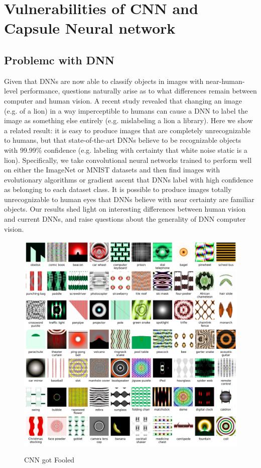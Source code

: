 \documentclass[12pt]{article}
\begin{document}
\section{\fontsize{14}{14}\selectfont Vulnerabilities of CNN and Capsule Neural network}   
\subsection{Problemc with DNN}
 Given that DNNs are now able to classify objects in images with near-human-level performance, questions naturally arise as to what differences remain between computer and human vision. A recent study revealed that changing an image (e.g. of a lion) in a way imperceptible to humans can cause a DNN to label the image as something else entirely (e.g. mislabeling a lion a library). Here we show a related result: it is easy to produce images that are completely unrecognizable to humans, but that state-of-the-art DNNs believe to be recognizable objects with 99.99\% confidence (e.g. labeling with certainty that white noise static is a lion). Specifically, we take convolutional neural networks trained to perform well on either the ImageNet or MNIST datasets and then find images with evolutionary algorithms or gradient ascent that DNNs label with high confidence as belonging to each dataset class. It is possible to produce images totally unrecognizable to human eyes that DNNs believe with near certainty are familiar objects. Our results shed light on interesting differences between human vision and current DNNs, and raise questions about the generality of DNN computer vision.
 
 \begin{figure}[h]
    	\centering
    	\includegraphics[width=1\textwidth]{fooled.jpg}
       	\label{fig:mesh20}
	 	 \caption{CNN got Fooled}
	\end{figure} 
 
\end{document}
